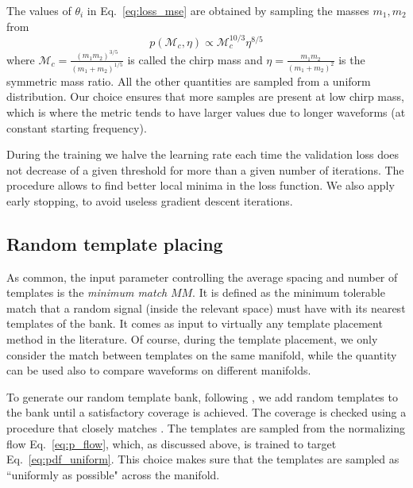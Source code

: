 \documentclass[twocolumn,showpacs,preprintnumbers,nofootinbib,prd,
superscriptaddress,10pt]{revtex4-2}
\begin{document}
The values of $\theta_i$ in Eq.~\eqref{eq:loss_mse} are obtained by sampling the masses $m_1, m_2$ from
\begin{equation}
	p(\mathcal{M}_c, \eta) \propto \mathcal{M}_c^{10/3} \eta^{8/5}
\end{equation}
where $\mathcal{M}_c = \frac{(m_1m_2)^{3/5}}{(m_1+m_2)^{1/5}}$ is called the chirp mass and $\eta = \frac{m_1m_2}{(m_1+m_2)^2}$ is the symmetric mass ratio.
All the other quantities are sampled from a uniform distribution.
Our choice ensures that more samples are present at low chirp mass, which is where the metric tends to have larger values due to longer waveforms (at constant starting frequency).

During the training we halve the learning rate each time the validation loss does not decrease of a given threshold for more than a given number of iterations. The procedure allows to find better local minima in the loss function. We also apply early stopping, to avoid useless gradient descent iterations.

\subsection{Random template placing} \label{sec:template_placing}

As common, the input parameter controlling the average spacing and number of templates is the {\it minimum match} $MM$. It is defined as the minimum tolerable match that a random signal (inside the relevant space) must have with its nearest templates of the bank. It comes as input to virtually any template placement method in the literature.
Of course, during the template placement, we only consider the match between templates on the same manifold, while the quantity can be used also to compare waveforms on different manifolds.

To generate our random template bank, following \cite{Messenger:2008ta}, we add random templates to the bank until a satisfactory coverage is achieved. The coverage is checked using a procedure that closely matches \cite{Coogan:2022qxs}.
The templates are sampled from the normalizing flow Eq.~\eqref{eq:p_flow}, which, as discussed above, is trained to target Eq.~\eqref{eq:pdf_uniform}. This choice makes sure that the templates are sampled as ``uniformly as possible" across the manifold.
\end{document}
